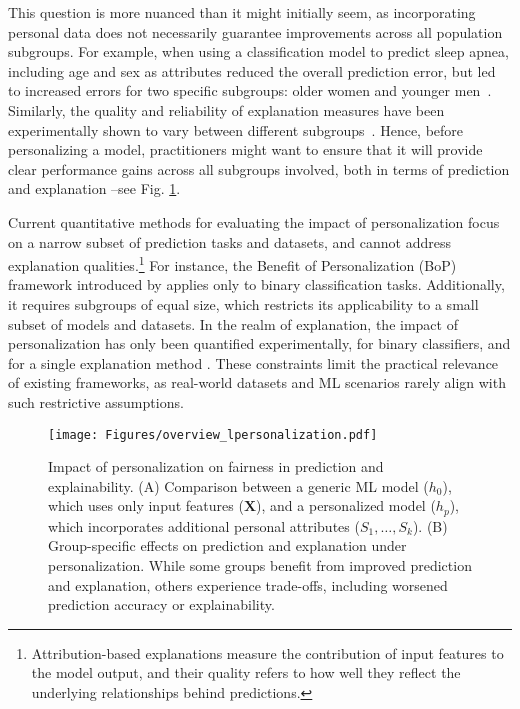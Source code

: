 This question is more nuanced than it might initially seem, as incorporating personal data does not necessarily guarantee improvements across all population subgroups. For example, when using a classification model to predict sleep apnea, including age and sex as attributes reduced the overall prediction error, but led to increased errors for two specific subgroups: older women and younger men~\citep{suriyakumar2023personalizationharmsreconsideringuse}. Similarly, the quality and reliability of explanation measures have been experimentally shown to vary between different subgroups~\citep{Balagopalan_2022}. Hence, before personalizing a model, practitioners might want to ensure that it will provide clear performance gains across all subgroups involved, both in terms of prediction and explanation --see Fig. \ref{fig:overview}.


Current quantitative methods for evaluating the impact of personalization focus on a narrow subset of prediction tasks and datasets, and cannot address explanation qualities.\footnote{Attribution-based explanations measure the contribution of input features to the model output, and their quality refers to how well they reflect the underlying relationships behind predictions.} For instance, the Benefit of Personalization (BoP) framework introduced by \citet{monteiro2022epistemic} applies only to binary classification tasks. Additionally, it requires subgroups of equal size, which restricts its applicability to a small subset of models and datasets. In the realm of explanation, the impact of personalization has only been quantified experimentally, for binary classifiers, and for a single explanation method \citep{Balagopalan_2022}. These constraints limit the practical relevance of existing frameworks, as real-world datasets and ML scenarios rarely align with such restrictive assumptions. 


\begin{figure}
    \centering
    \texttt{[image: Figures/overview\_lpersonalization.pdf]}
    \vspace{-1.7em}
    \caption{Impact of personalization on fairness in prediction and explainability.  
(A) Comparison between a generic ML model (\( h_0 \)), which uses only input features (\( \mathbf{X} \)), and a personalized model (\( h_p \)), which incorporates additional personal attributes (\( S_1, \dots, S_k \)).  
(B) Group-specific effects on prediction and explanation under personalization. While some groups benefit from improved prediction and explanation, others experience trade-offs, including worsened prediction accuracy or explainability.}
    \label{fig:overview}
    \vspace{-1.2em}
\end{figure}

